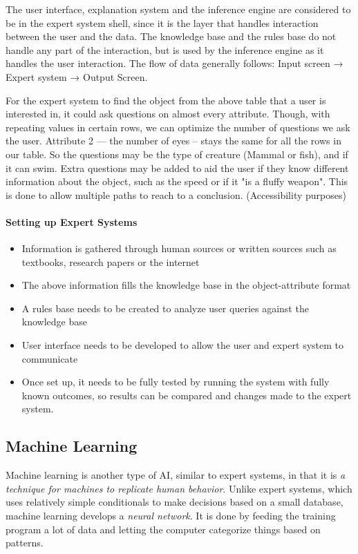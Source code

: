 \documentclass[../main.tex]{subfiles}
\begin{document}
The user interface, explanation system and the inference engine are considered to be in the expert system shell, since it is the layer that handles interaction between the user and the data. The knowledge base and the rules base do not handle any part of the interaction, but is used by the inference engine as it handles the user interaction. The flow of data generally follows: Input screen → Expert system → Output Screen.

For the expert system to find the object from the above table that a user is interested in, it could ask questions on almost every attribute. Though, with repeating values in certain rows, we can optimize the number of questions we ask the user. Attribute 2 — the number of eyes – stays the same for all the rows in our table. So the questions may be the type of creature (Mammal or fish), and if it can swim. Extra questions may be added to aid the user if they know different information about the object, such as the speed or if it "is a fluffy weapon". This is done to allow multiple paths to reach to a conclusion. (Accessibility purposes)

\paragraph{Setting up Expert Systems}

\begin{itemize}
    \item Information is gathered through human sources or written sources such as textbooks, research papers or the internet
    \item The above information fills the knowledge base in the object-attribute format
    \item A rules base needs to be created to analyze user queries against the knowledge base
    \item User interface needs to be developed to allow the user and expert system to communicate
    \item Once set up, it needs to be fully tested by running the system with fully known outcomes, so results can be compared and changes made to the expert system.
\end{itemize}

\subsection{Machine Learning}
\label{6:sec:ml}

Machine learning is another type of AI, similar to expert systems, in that it is \emph{a technique for machines to replicate human behavior}. Unlike expert systems, which uses relatively simple conditionals to make decisions based on a small database, machine learning develops a \emph{neural network}. It is done by feeding the training program a lot of data and letting the computer categorize things based on patterns.
\end{document}
